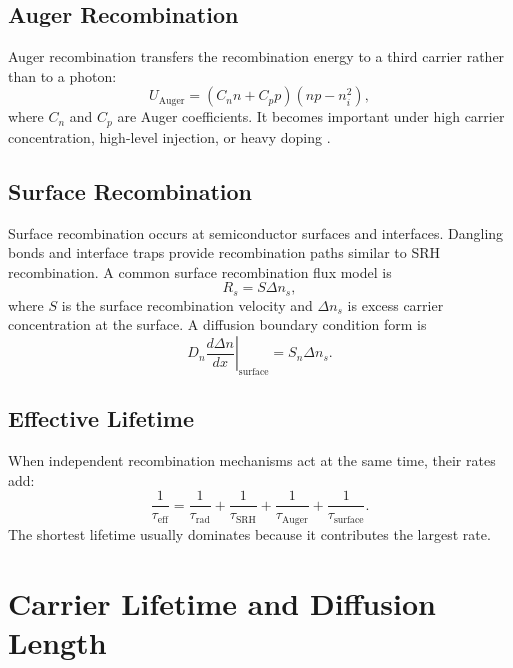 \documentclass[11pt,a4paper]{article}
\newcommand{\dd}{\Delta}
\newcommand{\nint}{n_i}
\begin{document}
\subsection{Auger Recombination}

Auger recombination transfers the recombination energy to a third carrier rather than to a photon:
\begin{equation}
  U_{\mathrm{Auger}}=(C_n n+C_p p)(np-\nint^2),
\end{equation}
where \(C_n\) and \(C_p\) are Auger coefficients. It becomes important under high carrier concentration, high-level injection, or heavy doping \cite{entner2007,sze2007}.

\subsection{Surface Recombination}

Surface recombination occurs at semiconductor surfaces and interfaces. Dangling bonds and interface traps provide recombination paths similar to SRH recombination. A common surface recombination flux model is
\begin{equation}
  R_s=S\dd n_s,
\end{equation}
where \(S\) is the surface recombination velocity and \(\dd n_s\) is excess carrier concentration at the surface. A diffusion boundary condition form is
\begin{equation}
  D_n\left.\frac{d\dd n}{dx}\right|_{\mathrm{surface}}=S_n\dd n_s .
\end{equation}

\subsection{Effective Lifetime}

When independent recombination mechanisms act at the same time, their rates add:
\begin{equation}
  \frac{1}{\tau_{\mathrm{eff}}}
  =
  \frac{1}{\tau_{\mathrm{rad}}}
  +\frac{1}{\tau_{\mathrm{SRH}}}
  +\frac{1}{\tau_{\mathrm{Auger}}}
  +\frac{1}{\tau_{\mathrm{surface}}}.
\end{equation}
The shortest lifetime usually dominates because it contributes the largest rate.

\section{Carrier Lifetime and Diffusion Length}
\end{document}
